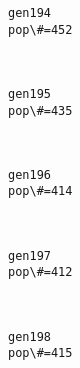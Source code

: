 \documentclass[11pt]{article}
\begin{document}
    \begin{Verbatim}[commandchars=\\\{\}]
gen194
pop\#=452

    \end{Verbatim}

    \begin{center}
    \end{center}
    { \hspace*{\fill} \\}
    
    \begin{Verbatim}[commandchars=\\\{\}]
gen195
pop\#=435

    \end{Verbatim}

    \begin{center}
    \end{center}
    { \hspace*{\fill} \\}
    
    \begin{Verbatim}[commandchars=\\\{\}]
gen196
pop\#=414

    \end{Verbatim}

    \begin{center}
    \end{center}
    { \hspace*{\fill} \\}
    
    \begin{Verbatim}[commandchars=\\\{\}]
gen197
pop\#=412

    \end{Verbatim}

    \begin{center}
    \end{center}
    { \hspace*{\fill} \\}
    
    \begin{Verbatim}[commandchars=\\\{\}]
gen198
pop\#=415

    \end{Verbatim}
\end{document}
